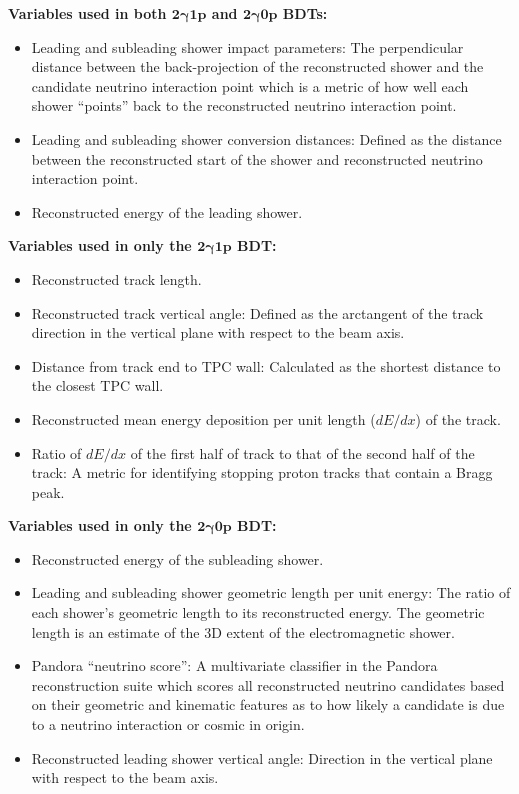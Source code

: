 \noindent \textbf{Variables used in both $\bm{2\gamma1p}$ and $ \bm{2\gamma0p}$ BDTs:}
\begin{itemize}
    \item Leading and subleading shower impact parameters: The perpendicular distance between the back-projection of the reconstructed shower and the candidate neutrino interaction point which is a metric of how well each shower ``points'' back to the reconstructed neutrino interaction point. 
    \item Leading and subleading shower conversion distances: Defined as the distance between the reconstructed start of the shower and reconstructed neutrino interaction point. 
    \item Reconstructed energy of the leading shower.
\end{itemize}
\noindent \textbf{Variables used in only the $\bm{2\gamma1p}$ BDT:}
\begin{itemize}
    \item Reconstructed track length.
    \item Reconstructed track vertical angle: Defined as the arctangent of the track direction in the vertical plane with respect to the beam axis.
    \item Distance from track end to TPC wall: Calculated as the shortest distance to the closest TPC wall.
    \item Reconstructed mean energy deposition per unit length ($dE/dx$) of the track.
    \item Ratio of $dE/dx$ of the first half of track to that of the second half of the track: A metric for identifying stopping proton tracks that contain a Bragg peak.
\end{itemize}
\noindent \textbf{Variables used in only the $\bm{2\gamma0p}$ BDT:}
\begin{itemize}
    \item Reconstructed energy of the subleading shower.
    \item Leading and subleading shower geometric length per unit energy: The ratio of each shower's geometric length to its reconstructed energy. The geometric length is an estimate of the 3D extent of the electromagnetic shower. 
    \item Pandora ``neutrino score'': A multivariate classifier in the Pandora reconstruction suite which scores all reconstructed neutrino candidates based on their geometric and kinematic features as to how likely a candidate is due to a neutrino interaction or cosmic in origin.
    \item Reconstructed leading shower vertical angle: Direction in the vertical plane with respect to the beam axis.
\end{itemize}

